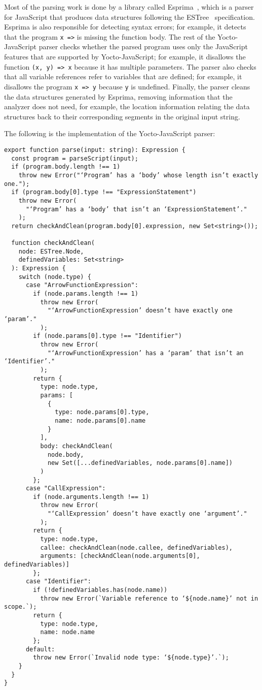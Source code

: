 \documentclass[12pt, oneside]{book}
\begin{document}
Most of the parsing work is done by a library called Esprima~\cite{esprima}, which is a parser for JavaScript that produces data structures following the ESTree~\cite{estree} specification. Esprima is also responsible for detecting syntax errors; for example, it detects that the program \texttt{x =>} is missing the function body. The rest of the Yocto-JavaScript parser checks whether the parsed program uses only the JavaScript features that are supported by Yocto-JavaScript; for example, it disallows the function \texttt{(x, y) => x} because it has multiple parameters. The parser also checks that all variable references refer to variables that are defined; for example, it disallows the program \texttt{x => y} because \texttt{y} is undefined. Finally, the parser cleans the data structures generated by Esprima, removing information that the analyzer does not need, for example, the location information relating the data structures back to their corresponding segments in the original input string.

The following is the implementation of the Yocto-JavaScript parser:

\begin{verbatim}
export function parse(input: string): Expression {
  const program = parseScript(input);
  if (program.body.length !== 1)
    throw new Error("‘Program’ has a ‘body’ whose length isn’t exactly one.");
  if (program.body[0].type !== "ExpressionStatement")
    throw new Error(
      "‘Program’ has a ‘body’ that isn’t an ‘ExpressionStatement’."
    );
  return checkAndClean(program.body[0].expression, new Set<string>());

  function checkAndClean(
    node: ESTree.Node,
    definedVariables: Set<string>
  ): Expression {
    switch (node.type) {
      case "ArrowFunctionExpression":
        if (node.params.length !== 1)
          throw new Error(
            "‘ArrowFunctionExpression’ doesn’t have exactly one ‘param’."
          );
        if (node.params[0].type !== "Identifier")
          throw new Error(
            "‘ArrowFunctionExpression’ has a ‘param’ that isn’t an ‘Identifier’."
          );
        return {
          type: node.type,
          params: [
            {
              type: node.params[0].type,
              name: node.params[0].name
            }
          ],
          body: checkAndClean(
            node.body,
            new Set([...definedVariables, node.params[0].name])
          )
        };
      case "CallExpression":
        if (node.arguments.length !== 1)
          throw new Error(
            "‘CallExpression’ doesn’t have exactly one ‘argument’."
          );
        return {
          type: node.type,
          callee: checkAndClean(node.callee, definedVariables),
          arguments: [checkAndClean(node.arguments[0], definedVariables)]
        };
      case "Identifier":
        if (!definedVariables.has(node.name))
          throw new Error(`Variable reference to ‘${node.name}’ not in scope.`);
        return {
          type: node.type,
          name: node.name
        };
      default:
        throw new Error(`Invalid node type: ‘${node.type}’.`);
    }
  }
}
\end{verbatim}
\end{document}
